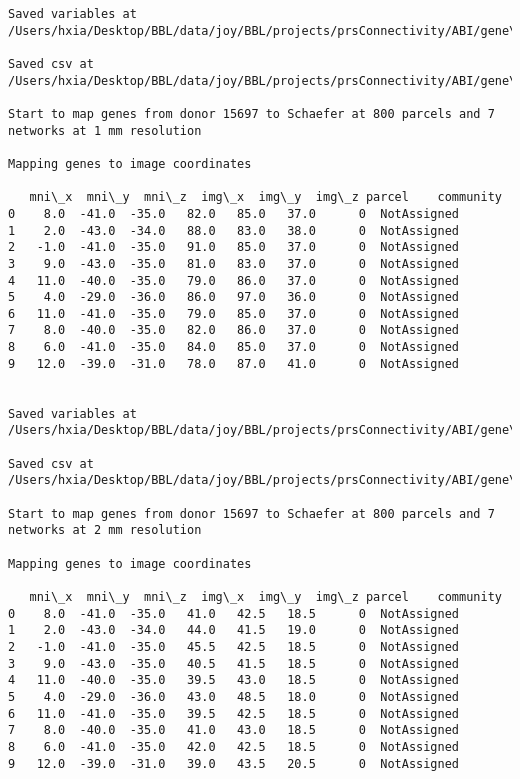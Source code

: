 \documentclass[11pt]{article}
\begin{document}
\begin{Verbatim}[commandchars=\\\{\}]
Saved variables at /Users/hxia/Desktop/BBL/data/joy/BBL/projects/prsConnectivity/ABI/gene\_mapping/15697donor\_600Parcels\_17Network\_2mm.pkl

Saved csv at /Users/hxia/Desktop/BBL/data/joy/BBL/projects/prsConnectivity/ABI/gene\_mapping/15697donor\_600Parcels\_17Network\_2mm.csv

Start to map genes from donor 15697 to Schaefer at 800 parcels and 7 networks at 1 mm resolution

Mapping genes to image coordinates

   mni\_x  mni\_y  mni\_z  img\_x  img\_y  img\_z parcel    community
0    8.0  -41.0  -35.0   82.0   85.0   37.0      0  NotAssigned
1    2.0  -43.0  -34.0   88.0   83.0   38.0      0  NotAssigned
2   -1.0  -41.0  -35.0   91.0   85.0   37.0      0  NotAssigned
3    9.0  -43.0  -35.0   81.0   83.0   37.0      0  NotAssigned
4   11.0  -40.0  -35.0   79.0   86.0   37.0      0  NotAssigned
5    4.0  -29.0  -36.0   86.0   97.0   36.0      0  NotAssigned
6   11.0  -41.0  -35.0   79.0   85.0   37.0      0  NotAssigned
7    8.0  -40.0  -35.0   82.0   86.0   37.0      0  NotAssigned
8    6.0  -41.0  -35.0   84.0   85.0   37.0      0  NotAssigned
9   12.0  -39.0  -31.0   78.0   87.0   41.0      0  NotAssigned


Saved variables at /Users/hxia/Desktop/BBL/data/joy/BBL/projects/prsConnectivity/ABI/gene\_mapping/15697donor\_800Parcels\_7Network\_1mm.pkl

Saved csv at /Users/hxia/Desktop/BBL/data/joy/BBL/projects/prsConnectivity/ABI/gene\_mapping/15697donor\_800Parcels\_7Network\_1mm.csv

Start to map genes from donor 15697 to Schaefer at 800 parcels and 7 networks at 2 mm resolution

Mapping genes to image coordinates

   mni\_x  mni\_y  mni\_z  img\_x  img\_y  img\_z parcel    community
0    8.0  -41.0  -35.0   41.0   42.5   18.5      0  NotAssigned
1    2.0  -43.0  -34.0   44.0   41.5   19.0      0  NotAssigned
2   -1.0  -41.0  -35.0   45.5   42.5   18.5      0  NotAssigned
3    9.0  -43.0  -35.0   40.5   41.5   18.5      0  NotAssigned
4   11.0  -40.0  -35.0   39.5   43.0   18.5      0  NotAssigned
5    4.0  -29.0  -36.0   43.0   48.5   18.0      0  NotAssigned
6   11.0  -41.0  -35.0   39.5   42.5   18.5      0  NotAssigned
7    8.0  -40.0  -35.0   41.0   43.0   18.5      0  NotAssigned
8    6.0  -41.0  -35.0   42.0   42.5   18.5      0  NotAssigned
9   12.0  -39.0  -31.0   39.0   43.5   20.5      0  NotAssigned



\end{Verbatim}
\end{document}
